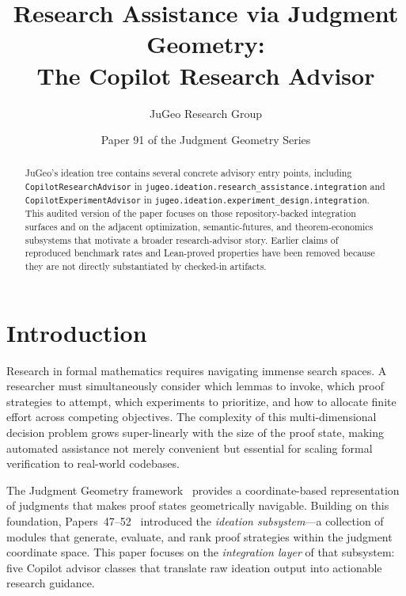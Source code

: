 \documentclass[11pt]{article}
\title{Research Assistance via Judgment Geometry:\\
       The Copilot Research Advisor}
\author{JuGeo Research Group}
\date{Paper 91 of the Judgment Geometry Series}
\begin{document}
\maketitle

\begin{abstract}
JuGeo's ideation tree contains several concrete advisory entry points,
including \texttt{CopilotResearchAdvisor} in
\texttt{jugeo.ideation.research\_assistance.integration} and
\texttt{CopilotExperimentAdvisor} in
\texttt{jugeo.ideation.experiment\_design.integration}.  This audited
version of the paper focuses on those repository-backed integration
surfaces and on the adjacent optimization, semantic-futures, and
theorem-economics subsystems that motivate a broader research-advisor
story.  Earlier claims of reproduced benchmark rates and Lean-proved
properties have been removed because they are not directly substantiated
by checked-in artifacts.
\end{abstract}

\section{Introduction}\label{sec:intro}

Research in formal mathematics requires navigating immense search
spaces.  A researcher must simultaneously consider which lemmas to
invoke, which proof strategies to attempt, which experiments to
prioritize, and how to allocate finite effort across competing
objectives.  The complexity of this multi-dimensional decision
problem grows super-linearly with the size of the proof state,
making automated assistance not merely convenient but essential
for scaling formal verification to real-world codebases.

The Judgment Geometry framework~\cite{paper00} provides a
coordinate-based representation of judgments that makes proof
states geometrically navigable.  Building on this foundation,
Papers~47--52~\cite{paper47,paper48,paper49,paper50,paper51,paper52}
introduced the \emph{ideation subsystem}—a collection of modules
that generate, evaluate, and rank proof strategies within the
judgment coordinate space.  This paper focuses on the
\emph{integration layer} of that subsystem: five Copilot advisor
classes that translate raw ideation output into actionable
research guidance.
\end{document}
